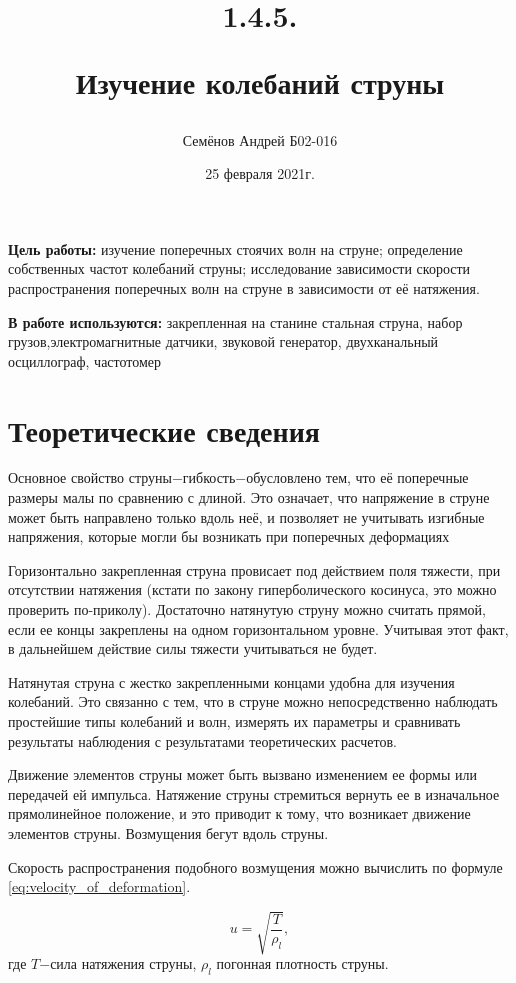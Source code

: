 \documentclass[13pt,a4paper]{article}
\title{
1.4.5.

Изучение колебаний струны
}
\author{Семёнов Андрей Б02-016}
\date{25 февраля 2021г.}
\begin{document}
\maketitle
\newpage

\textbf{Цель работы:} изучение поперечных стоячих волн на струне; определение собственных частот колебаний струны;
исследование зависимости скорости распространения поперечных волн на струне в зависимости от её натяжения.

\textbf{В работе используются:} закрепленная на станине стальная струна, набор грузов,электромагнитные датчики, звуковой генератор, двухканальный осциллограф, частотомер

\section{Теоретические сведения}
Основное свойство струны$-$гибкость$-$обусловлено тем, что её поперечные размеры малы по сравнению с длиной. Это означает, что напряжение в струне может быть направлено только вдоль неё, и позволяет не учитывать изгибные напряжения, которые могли бы возникать при поперечных деформациях

Горизонтально закрепленная струна провисает под действием поля тяжести, при отсутствии натяжения (кстати по закону гиперболического косинуса, это можно проверить по-приколу). Достаточно натянутую струну можно считать прямой, если ее концы закреплены на одном горизонтальном уровне. Учитывая этот факт, в дальнейшем действие силы тяжести учитываться не будет.

Натянутая струна с жестко закрепленными концами удобна для изучения колебаний. Это связанно с тем, что в струне можно непосредственно наблюдать простейшие типы колебаний и волн, измерять их параметры и сравнивать результаты наблюдения с результатами теоретических расчетов.

Движение элементов струны может быть вызвано изменением ее формы или передачей ей импульса. Натяжение струны стремиться вернуть ее в изначальное прямолинейное положение, и это приводит к тому, что возникает движение элементов струны. Возмущения бегут вдоль струны.

Скорость распространения подобного возмущения можно вычислить по формуле \ref{eq:velocity_of_deformation}.

\begin{equation}
	u = \sqrt{\frac{T}{\rho_{l}}},
	\label{eq:velocity_of_deformation}
\end{equation}
где $T$$-$сила натяжения струны, $\rho_{l}$ погонная плотность струны.
\end{document}
